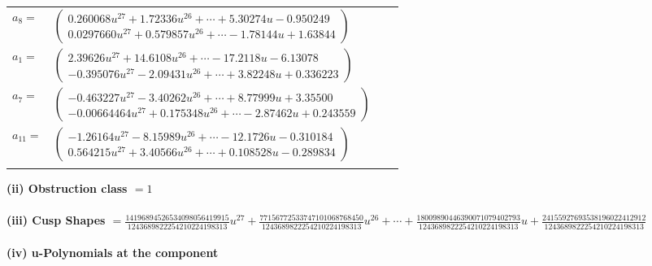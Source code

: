 \documentclass[1p]{elsarticle_modified}
\theoremstyle{definition}
\begin{document}
\begin{tabular}{m{7pt} m{180pt} m{7pt} m{180pt} }
\flushright $a_{8}=$&$\begin{pmatrix}0.260068 u^{27}+1.72336 u^{26}+\cdots+5.30274 u-0.950249\\0.0297660 u^{27}+0.579857 u^{26}+\cdots-1.78144 u+1.63844\end{pmatrix}$ \\
\flushright $a_{1}=$&$\begin{pmatrix}2.39626 u^{27}+14.6108 u^{26}+\cdots-17.2118 u-6.13078\\-0.395076 u^{27}-2.09431 u^{26}+\cdots+3.82248 u+0.336223\end{pmatrix}$ \\
\flushright $a_{7}=$&$\begin{pmatrix}-0.463227 u^{27}-3.40262 u^{26}+\cdots+8.77999 u+3.35500\\-0.00664464 u^{27}+0.175348 u^{26}+\cdots-2.87462 u+0.243559\end{pmatrix}$ \\
\flushright $a_{11}=$&$\begin{pmatrix}-1.26164 u^{27}-8.15989 u^{26}+\cdots-12.1726 u-0.310184\\0.564215 u^{27}+3.40566 u^{26}+\cdots+0.108528 u-0.289834\end{pmatrix}$\\&\end{tabular}
\flushleft \textbf{(ii) Obstruction class $= 1$}\\~\\
\flushleft \textbf{(iii) Cusp Shapes $= \frac{14196894526534098056419915}{1243689822254210224198313} u^{27}+\frac{77156772533747101068768450}{1243689822254210224198313} u^{26}+\cdots+\frac{18009890446390071079402793}{1243689822254210224198313} u+\frac{24155927693538196022412912}{1243689822254210224198313}$}\\~\\
\newpage\renewcommand{\arraystretch}{1}
\flushleft \textbf{(iv) u-Polynomials at the component}\newline \\
\end{document}

